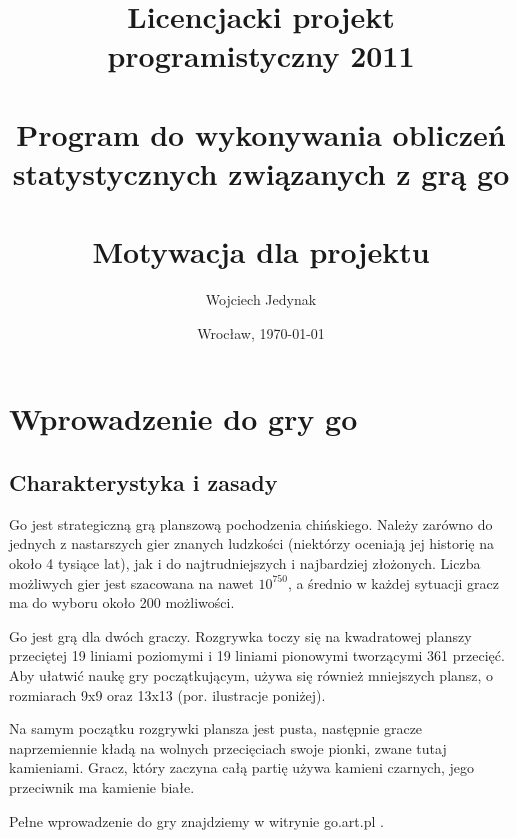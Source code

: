 \documentclass[11pt,leqno]{article}
\title{\LARGE Licencjacki projekt programistyczny 2011 \\ 
       \ \\
       Program do wykonywania obliczeń statystycznych związanych z grą go \\ 
       \ \\
       Motywacja dla projektu }
\author{Wojciech Jedynak}
\date{Wrocław, \today}
\begin{document}
\maketitle 

\thispagestyle{empty}
\tableofcontents

\newpage


\section{Wprowadzenie do gry go}

\subsection{Charakterystyka i zasady}

Go jest strategiczną grą planszową pochodzenia chińskiego. Należy zarówno do jednych z nastarszych gier znanych 
ludzkości (niektórzy oceniają jej historię na około 4 tysiące lat), jak i do najtrudniejszych i najbardziej złożonych.
Liczba możliwych gier jest szacowana na nawet $ 10^{750} $, a średnio w każdej sytuacji gracz ma do wyboru około 200 możliwości.

Go jest grą dla dwóch graczy. Rozgrywka toczy się na kwadratowej planszy przeciętej 19 liniami poziomymi i 19 liniami pionowymi 
tworzącymi 361 przecięć. Aby ułatwić naukę gry  początkującym, używa się również mniejszych plansz, 
o rozmiarach 9x9 oraz 13x13 (por. ilustracje poniżej).

Na samym początku rozgrywki plansza jest pusta, następnie gracze naprzemiennie kładą na wolnych przecięciach swoje pionki, 
zwane tutaj kamieniami. Gracz, który zaczyna całą partię używa kamieni czarnych, jego przeciwnik ma kamienie białe.

Pełne wprowadzenie do gry znajdziemy w witrynie go.art.pl \cite{rules}.
\end{document}
